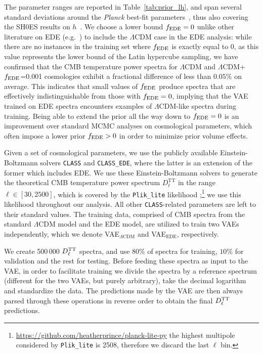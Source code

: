 \documentclass[aps, prd, reprint, superscriptaddress, nofootinbib, bibnotes]{revtex4-2}
\newcommand{\Planck}{\textit{Planck}}
\begin{document}
The parameter ranges are reported in Table~\ref{tab:prior_lh}, and span several standard deviations around the \Planck{} best-fit parameters~\cite{Planck:2018vyg}, thus also covering the SH0ES results on $h$~\cite{Riess:2021jrx}. We choose a lower bound $f_{\rm EDE} = 0$ unlike other literature on EDE (e.g.\ \citep{Hill:2020osr, Reeves:2022aoi}) to include the $\Lambda$CDM case in the EDE analysis: while there are no instances in the training set where $f_{\rm EDE}$ is exactly equal to 0, as this value represents the lower bound of the Latin hypercube sampling, we have confirmed that the CMB temperature power spectra for $\Lambda$CDM and $\Lambda$CDM+$f_{\rm EDE}$=0.001 cosmologies exhibit a fractional difference of less than $0.05\%$ on average. This indicates that small values of $f_{\rm EDE}$ produce spectra that are effectively indistinguishable from those with $f_{\rm EDE} = 0$, implying that the VAE trained on EDE spectra encounters examples of $\Lambda$CDM-like spectra during training. Being able to extend the prior all the way down to $f_{\rm EDE}=0$ is an improvement over standard MCMC analyses on cosmological parameters, which often impose a lower prior $f_{\rm EDE}>0$ in order to minimize prior volume effects.

Given a set of cosmological parameters, we use the publicly available Einstein-Boltzmann solvers \texttt{CLASS} and \texttt{CLASS\_EDE}, where the latter is an extension of the former which includes EDE.
We use these Einstein-Boltzmann solvers to generate the theoretical CMB temperature power spectrum $D_{\ell}^{\mathrm{TT}}$ in the range $\ell \in [30, 2500]$, which is covered by the \texttt{Plik\_lite} likelihood \cite{Planck:2019nip, Prince:2019hse};\footnote{\href{https://github.com/heatherprince/planck-lite-py}{https://github.com/heatherprince/planck-lite-py} the highest multipole considered by \texttt{Plik\_lite} is 2508, therefore we discard the last $\ell$ bin.} we use this likelihood throughout our analysis. All other \texttt{CLASS}-related parameters are left to their standard values.
The training data, comprised of CMB spectra from the standard $\Lambda$CDM model and the EDE model, are utilized to train two VAEs independently, which we denote VAE$_{\Lambda \mathrm{CDM}}$ and VAE$_{\mathrm{EDE}}$, respectively.

We create 500\,000 $D_{\ell}^{\rm TT}$ spectra, and use $80\%$ of spectra for training, $10\%$ for validation and the rest for testing. Before feeding these spectra as input to the VAE, in order to facilitate training we divide the spectra by a reference spectrum (different for the two VAEs, but purely arbitrary), take the decimal logarithm and standardize the data. The predictions made by the VAE are then always parsed through these operations in reverse order to obtain the final $D_{\ell}^{\rm TT}$ predictions. 
\end{document}
